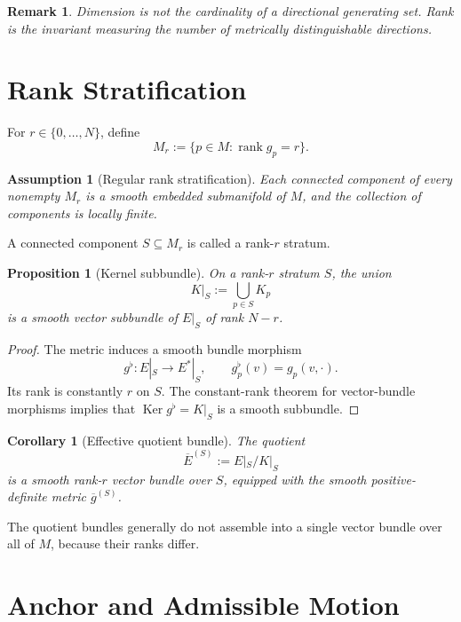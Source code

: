 \documentclass[11pt]{article}
\newtheorem{assumption}{Assumption}[section]
\newtheorem{proposition}{Proposition}[section]
\newtheorem{corollary}{Corollary}[section]
\newtheorem{remark}{Remark}[section]
\newcommand{\Ker}{\operatorname{Ker}}
\newcommand{\rank}{\operatorname{rank}}
\begin{document}
\begin{remark}
Dimension is not the cardinality of a directional generating set. Rank is the
invariant measuring the number of metrically distinguishable directions.
\end{remark}

\section{Rank Stratification}
\label{sec:strata}

For $r\in\{0,\ldots,N\}$, define
\[
M_r:=\{p\in M:\rank g_p=r\}.
\]

\begin{assumption}[Regular rank stratification]
Each connected component of every nonempty $M_r$ is a smooth embedded
submanifold of $M$, and the collection of components is locally finite.
\end{assumption}

A connected component $S\subseteq M_r$ is called a rank-$r$ stratum.

\begin{proposition}[Kernel subbundle]
On a rank-$r$ stratum $S$, the union
\[
K|_S:=\bigcup_{p\in S}K_p
\]
is a smooth vector subbundle of $E|_S$ of rank $N-r$.
\end{proposition}

\begin{proof}
The metric induces a smooth bundle morphism
\[
g^\flat:E|_S\to E^*|_S,
\qquad g^\flat_p(v)=g_p(v,\cdot).
\]
Its rank is constantly $r$ on $S$. The constant-rank theorem for vector-bundle
morphisms \cite{Lee2013} implies that $\Ker g^\flat=K|_S$ is a smooth
subbundle.
\end{proof}

\begin{corollary}[Effective quotient bundle]
The quotient
\[
\overline E^{(S)}:=E|_S/K|_S
\]
is a smooth rank-$r$ vector bundle over $S$, equipped with the smooth
positive-definite metric $\overline g^{(S)}$.
\end{corollary}

The quotient bundles generally do not assemble into a single vector bundle
over all of $M$, because their ranks differ.

\section{Anchor and Admissible Motion}
\label{sec:anchor}
\end{document}
